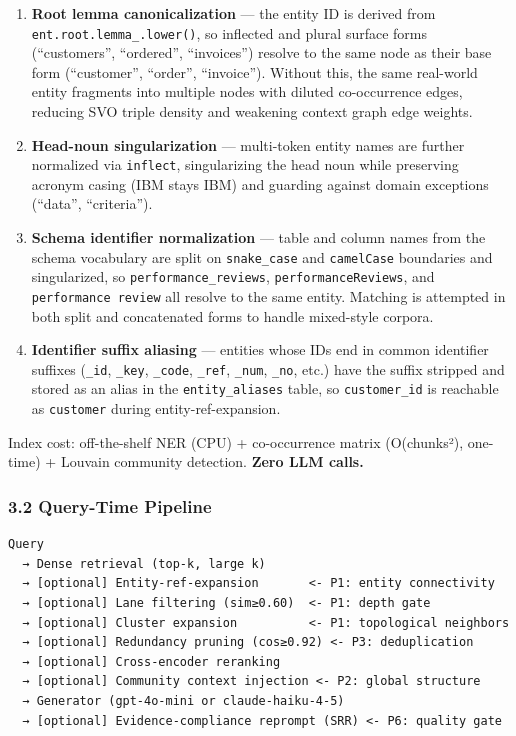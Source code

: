 \documentclass[
]{article}
\begin{document}
\begin{enumerate}
\def\labelenumi{\arabic{enumi}.}
\item
  \textbf{Root lemma canonicalization} --- the entity ID is derived from
  \texttt{ent.\allowbreak{}root.\allowbreak{}lemma\_.\allowbreak{}lower()},
  so inflected and plural surface forms (``customers'', ``ordered'',
  ``invoices'') resolve to the same node as their base form
  (``customer'', ``order'', ``invoice''). Without this, the same
  real-world entity fragments into multiple nodes with diluted
  co-occurrence edges, reducing SVO triple density and weakening context
  graph edge weights.
\item
  \textbf{Head-noun singularization} --- multi-token entity names are
  further normalized via \texttt{inflect}, singularizing the head noun
  while preserving acronym casing (IBM stays IBM) and guarding against
  domain exceptions (``data'', ``criteria'').
\item
  \textbf{Schema identifier normalization} --- table and column names
  from the schema vocabulary are split on \texttt{snake\_case} and
  \texttt{camelCase} boundaries and singularized, so
  \texttt{performance\_reviews}, \texttt{performanceReviews}, and
  \texttt{performance\ review} all resolve to the same entity. Matching
  is attempted in both split and concatenated forms to handle
  mixed-style corpora.
\item
  \textbf{Identifier suffix aliasing} --- entities whose IDs end in
  common identifier suffixes (\texttt{\_id}, \texttt{\_key},
  \texttt{\_code}, \texttt{\_ref}, \texttt{\_num}, \texttt{\_no}, etc.)
  have the suffix stripped and stored as an alias in the
  \texttt{entity\_aliases} table, so \texttt{customer\_id} is reachable
  as \texttt{customer} during entity-ref-expansion.
\end{enumerate}

Index cost: off-the-shelf NER (CPU) + co-occurrence matrix (O(chunks²),
one-time) + Louvain community detection. \textbf{Zero LLM calls.}

\subsubsection{3.2 Query-Time Pipeline}\label{query-time-pipeline}

\begin{small}
\begin{verbatim}
Query
  → Dense retrieval (top-k, large k)
  → [optional] Entity-ref-expansion       <- P1: entity connectivity
  → [optional] Lane filtering (sim≥0.60)  <- P1: depth gate
  → [optional] Cluster expansion          <- P1: topological neighbors
  → [optional] Redundancy pruning (cos≥0.92) <- P3: deduplication
  → [optional] Cross-encoder reranking
  → [optional] Community context injection <- P2: global structure
  → Generator (gpt-4o-mini or claude-haiku-4-5)
  → [optional] Evidence-compliance reprompt (SRR) <- P6: quality gate
\end{verbatim}
\end{small}
\end{document}

